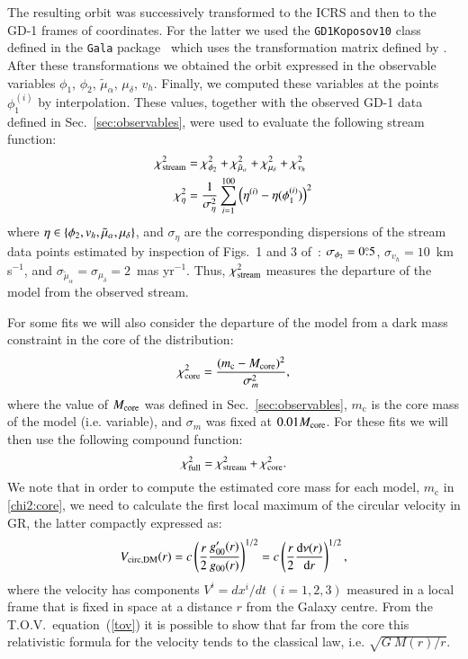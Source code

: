 \documentclass[twocolumn]{aa}
\begin{document}
The resulting orbit was successively transformed to the ICRS and then to the GD-1 frames of coordinates. For the latter we used the \texttt{GD1Koposov10} class defined in the \texttt{Gala} package~\citep{gala,adrian_price_whelan_2020_4159870} which uses the transformation matrix defined by \citet{Koposov_2010}.
After these transformations we obtained the orbit expressed in the observable variables $\phi_1$, $\phi_2$, $\tilde{\mu}_\alpha$, $\mu_\delta$, $v_h$. Finally, we computed these variables at the points $\phi_1^{(i)}$ by interpolation. These values, together with the observed GD-1 data defined in Sec.~\ref{sec:observables}, were used to evaluate the following stream function:
\begin{align}
   \label{chi2:stream}
   \chi^2_{\rm{stream}} &= \chi^2_{\phi_2} + \chi^2_{\tilde{\mu}_\alpha}+ \chi^2_{\mu_\delta}+\chi^2_{v_h}\\
   \label{chi2:component}
   \chi^2_{\eta} &= \frac{1}{\sigma_\eta^2}\sum_{i=1}^{100} \left(\eta^{(i)}-\eta(\phi_1^{(i)})\right)^2
\end{align}
where
$\eta\in\left\{\phi_2, v_h, \tilde{\mu}_\alpha, \mu_\delta\right\}$, and $\sigma_\eta$ are the corresponding dispersions of the stream data points estimated by inspection of Figs.~1 and 3 of~\citet{Ibata_2020}:
$\sigma_{\phi_2}=0\overset{\circ}{.} 5$,
$\sigma_{v_h} = 10$~km s$^{-1}$, and
$\sigma_{\tilde{\mu}_\alpha}= \sigma_{\mu_\delta}= 2$~mas yr$^{-1}$.
Thus, $\chi^2_{\rm{stream}}$ measures the departure of the model from the observed stream.

For some fits we will also consider the departure of the model from a dark mass constraint in the core
of the distribution:
\begin{equation}
   \label{chi2:core}
\chi^2_{\rm{core}}=\frac{(m_\mathrm{c}-M_{\rm{core}})^2}{\sigma_m^2},
\end{equation}
where the value of $M_{\rm{core}}$ was defined in Sec.~\ref{sec:observables}, $m_\mathrm{c}$ is the core mass of the model (i.e. variable), and
$\sigma_m$ was fixed at $0.01 M_{\rm{core}}$.
For these fits we will then use the following compound function:
\begin{equation}
   \label{chi2:full}
\chi^2_{\rm{full}}=\chi^2_{\rm{stream}}+\chi^2_{\rm{core}}.
\end{equation}
We note that in order to compute the estimated core mass for each model, $m_\mathrm{c}$ in \cref{chi2:core}, we need to calculate the first local maximum of the circular velocity in GR, the latter compactly expressed as:
\begin{equation}
   \label{v_circ_dm}
   V_{\rm{circ, DM}}(r)= c\left(\frac{r}{2}\frac{g_{00}'(r)}{g_{00}(r)}\right)^{1/2} =
                        c\left(\frac{r}{2}\frac{\mathrm{d}\nu(r)}{\mathrm{d}r}\right)^{1/2},
\end{equation}
where the velocity has components $V^i=dx^i/dt~(i=1,2,3)$ measured in a local frame that is fixed in space at a distance $r$ from the Galaxy centre. From the T.O.V.~equation~(\ref{tov}) it is possible to show that far from the core this relativistic formula for the velocity tends to the classical law, i.e. $\sqrt{G~M(r)/r}$.
\end{document}
